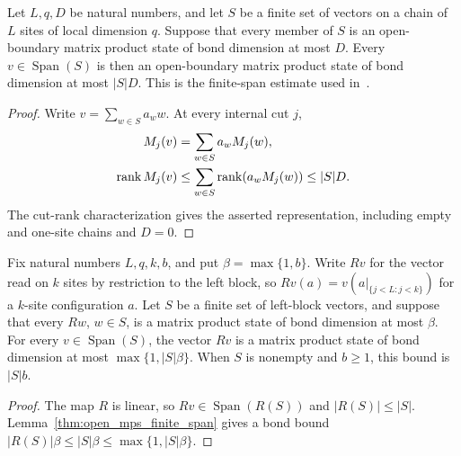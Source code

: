 \begin{lemma}
    \label{thm:open_mps_finite_span}
    \leanok
    Let $L,q,D$ be natural numbers, and let $S$ be a finite set of vectors
    on a chain of $L$ sites of local dimension $q$. Suppose that every
    member of $S$ is an open-boundary matrix product state of bond
    dimension at most $D$. Every $v\in\operatorname{Span}(S)$ is then an
    open-boundary matrix product state of bond dimension at most $|S|D$.
    This is the finite-span estimate used
    in~\cite[Claim~2.7, source lines 520--527]{Landau2015Polynomial}.
\end{lemma}
\begin{proof}\leanok
    Write $v=\sum_{w\in S}a_w w$. At every internal cut $j$,
    \begin{align}
        M_j(v)                    & =\sum_{w\in S}a_wM_j(w),\notag \\
        \operatorname{rank}M_j(v) & \le
        \sum_{w\in S}\operatorname{rank}(a_wM_j(w))\le |S|D.\notag
    \end{align}
    The cut-rank characterization gives the asserted representation,
    including empty and one-site chains and $D=0$.
\end{proof}

\begin{lemma}
    \label{thm:left_mps_finite_span}
    \leanok
    Fix natural numbers $L,q,k,b$, and put $\beta=\max\{1,b\}$.
    Write $Rv$ for the vector read on $k$ sites by restriction to the left
    block, so $Rv(a)=v(a|_{\{j<L:j<k\}})$ for a $k$-site configuration $a$.
    Let $S$ be a finite set of left-block vectors, and suppose that every
    $Rw$, $w\in S$, is a matrix product state of bond dimension at most
    $\beta$. For every $v\in\operatorname{Span}(S)$, the vector $Rv$ is a
    matrix product state of bond dimension at most $\max\{1,|S|\beta\}$.
    When $S$ is nonempty and $b\ge1$, this bound is $|S|b$.
\end{lemma}
\begin{proof}\leanok
    The map $R$ is linear, so $Rv\in\operatorname{Span}(R(S))$ and
    $|R(S)|\le |S|$. Lemma~\ref{thm:open_mps_finite_span} gives a bond
    bound $|R(S)|\beta\le |S|\beta\le\max\{1,|S|\beta\}$.
\end{proof}

